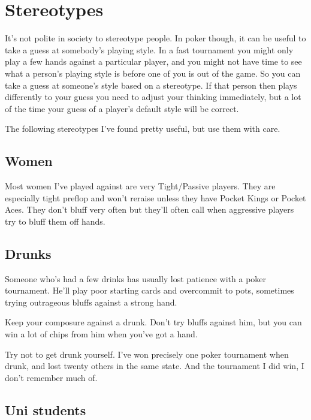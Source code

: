 \chapter{Stereotypes}


It's not polite in society to stereotype people. In poker though,
it can be useful to take a guess at somebody's playing style.
In a fast tournament you might only play a few hands against
a particular player, and you might not have time to see
what a person's playing style is before one of you is out
of the game. So you can take a guess at someone's style based
on a stereotype. If that person then plays differently to your guess
you need to adjust your thinking immediately, but a lot of the
time your guess of a player's default style will be correct.

The following stereotypes I've found pretty useful, but use them
with care.

\section{Women}

Most women I've played against are very Tight/Passive players. They
are especially tight preflop and won't reraise unless they have
Pocket Kings or Pocket Aces. They don't bluff very often but they'll
often call when aggressive players try to bluff them off hands.

\section{Drunks}

Someone who's had a few drinks has usually lost patience with a poker
tournament.  He'll play poor starting cards and overcommit to pots, sometimes
trying outrageous bluffs against a strong hand.

Keep your composure against a drunk. Don't try bluffs against him, but you
can win a lot of chips from him when you've got a hand.

Try not to get drunk yourself. I've won precisely one poker tournament
when drunk, and lost twenty others in the same state. And the
tournament I did win, I don't remember much of.


\section{Uni students}

